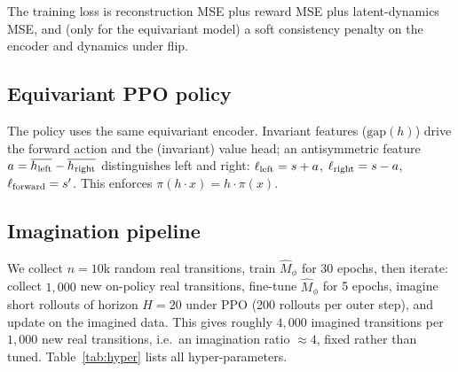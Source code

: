 \documentclass[sigconf,anonymous]{acmart}
\begin{document}
The training loss is reconstruction MSE plus reward MSE plus latent-dynamics
MSE, and (only for the equivariant model) a soft consistency penalty on the
encoder and dynamics under flip.

\subsection{Equivariant PPO policy}
The policy uses the same equivariant encoder. Invariant features
($\mathrm{gap}(h)$) drive the forward action and the (invariant) value head;
an antisymmetric feature $a=\overline{h_{\rm left}}-\overline{h_{\rm right}}$
distinguishes left and right:
$\ell_{\rm left}=s+a$, $\ell_{\rm right}=s-a$, $\ell_{\rm forward}=s'$.
This enforces $\pi(h\cdot x)=h\cdot\pi(x)$.

\subsection{Imagination pipeline}
We collect $n=10$k random real transitions, train $\hat M_\phi$ for 30
epochs, then iterate: collect $1{,}000$ new on-policy real transitions,
fine-tune $\hat M_\phi$ for 5 epochs, imagine short rollouts of horizon
$H=20$ under PPO \cite{ppo2017} (200 rollouts per outer step), and update on
the imagined data. This gives roughly $4{,}000$ imagined transitions per
$1{,}000$ new real transitions, i.e.\ an imagination ratio $\approx4$, fixed
rather than tuned. Table~\ref{tab:hyper} lists all hyper-parameters.
\end{document}
